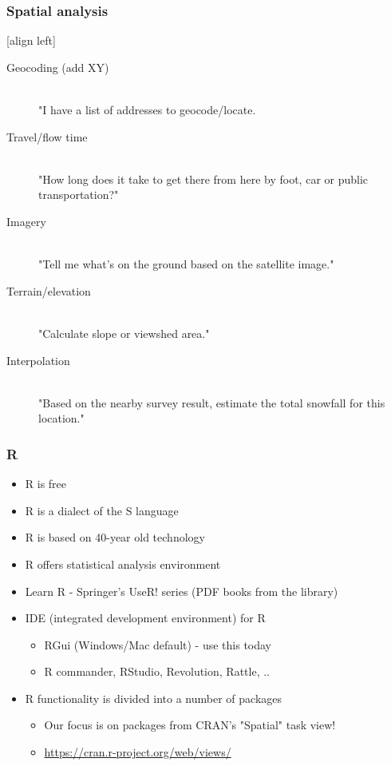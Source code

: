 \documentclass[11pt]{beamer}
\begin{document}
\begin{frame}
\frametitle{Spatial analysis}
[align left]
\begin{description}
  \item[Geocoding (add XY)] \hfill \\"I have a list of addresses to geocode/locate.
  \item[Travel/flow time] \hfill \\"How long does it take to get there from here by foot, car or public transportation?"
  \item[Imagery] \hfill \\"Tell me what's on the ground based on the satellite image."
  \item[Terrain/elevation] \hfill \\"Calculate slope or viewshed area."
  \item[Interpolation] \hfill \\"Based on the nearby survey result, estimate the total snowfall for this location."
\end{description}
\end{frame}


\begin{frame}
\frametitle{R}
\begin{itemize}
\item R is free
\item R is a dialect of the S language
\item R is based on 40-year old technology 
\item R offers statistical analysis environment
\item Learn R - Springer's UseR! series (PDF books from the library)
\item IDE (integrated development environment) for R
\begin{itemize}
\item RGui (Windows/Mac default) - use this today
\item R commander, RStudio, Revolution, Rattle, ..
\end{itemize}
\item R functionality is divided into a number of packages
\begin{itemize}
\item Our focus is on packages from CRAN's "Spatial" task view!
\item \href{https://cran.r-project.org/web/views/}{https://cran.r-project.org/web/views/}
\end{itemize}
\end{itemize}
\end{frame}
\end{document}
